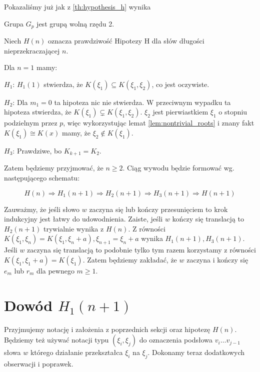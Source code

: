 Pokazaliśmy już jak z \ref{th:hypothesis_h} wynika

\begin{corollary}
  Grupa $G_p$ jest grupą wolną rzędu 2.
\end{corollary}

Niech $H(n)$ oznacza prawdziwość Hipotezy H dla słów długości nieprzekraczającej
$n$.

Dla $n=1$ mamy:
\begin{description}
  \item{$H_1$:}
    $H_1(1)$ stwierdza, że
    $K\left(\xi_1\right) \subseteq K\left(\xi_1, \xi_2\right)$, co jest
    oczywiste.
  \item{$H_2$:} Dla $m_1 = 0$ ta hipoteza nic nie stwierdza. W przeciwnym
    wypadku ta hipoteza stwierdza, że $K\left(\xi_1\right) \subsetneq K\left(\xi_1,
    \xi_2\right)$. $\xi_2$ jest pierwiastkiem $\xi_1$ o stopniu podzielnym przez
    $p$, więc wykorzystując lemat \ref{lem:nontrivial_roots} i znany fakt
    $K\left(\xi_1\right) \cong K(x)$ mamy, że $\xi_2 \not \in
    K\left(\xi_1\right)$.
  \item{$H_3$:} Prawdziwe, bo $K_{k+1} = K_2$.
\end{description}

Zatem będziemy przyjmować, że $n \geq 2$. Ciąg wywodu będzie formować wg.
następującego schematu:

\[ H(n) \Rightarrow H_1(n+1) \Rightarrow H_2(n+1) \Rightarrow H_3(n+1)
\Rightarrow H(n+1)\]

Zauważmy, że jeśli słowo $w$ zaczyna się lub kończy przesunięciem to krok
indukcyjny jest łatwy do udowodnienia. Zaiste, jeśli $w$ kończy się translacją
to $H_2(n+1)$ trywialnie wynika z $H(n)$.  Z równości $K\left(\xi_1,
\xi_{n}\right) = K\left(\xi_1, \xi_{n} + a\right), \xi_{n+1} = \xi_n + a$ wynika
$H_1(n+1), H_3(n+1)$. Jeśli $w$ zaczyna się translacją to podobnie tylko tym
razem korzystamy z równości $K\left(\xi_1, \xi_1 + a\right) =
K\left(\xi_1\right)$. Zatem będziemy zakładać, że $w$ zaczyna i kończy się $e_m$
lub $r_m$ dla pewnego $m \geq 1$.

\section{Dowód $H_1(n+1)$}
Przyjmujemy notację i założenia z poprzednich sekcji oraz hipotezę $H(n)$.
Będziemy też używać notacji typu $\left(\xi_i, \xi_j\right)$ do oznaczenia
podsłowa $v_i\ldots v_{j-1}$ słowa $w$ którego działanie przekształca $\xi_i$ na
$\xi_j$. Dokonamy teraz dodatkowych obserwacji i poprawek.

